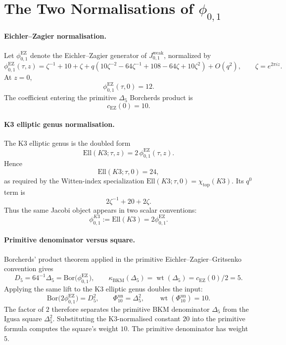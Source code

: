 \providecommand{\Ell}{\mathrm{Ell}}
\providecommand{\EZ}{\mathrm{EZ}}
\providecommand{\Kthree}{K3}
\providecommand{\kBKM}{\kappa_{\mathrm{BKM}}}
\providecommand{\DeltaFive}{\Delta_5}
\providecommand{\PhiTen}{\Phi_{10}^{\mathrm{un}}}

\section*{The Two Normalisations of \(\phi_{0,1}\)}

\paragraph{Eichler--Zagier normalisation.}
Let \(\phi_{0,1}^{\EZ}\) denote the Eichler--Zagier generator of
\(J^{\mathrm{weak}}_{0,1}\), normalized by
\[
  \phi_{0,1}^{\EZ}(\tau,z)
  =
  \zeta^{-1}+10+\zeta
  +
  q(10\zeta^{-2}-64\zeta^{-1}+108-64\zeta+10\zeta^2)
  +O(q^2),
  \qquad
  \zeta=e^{2\pi iz}.
\]
At \(z=0\),
\[
  \phi_{0,1}^{\EZ}(\tau,0)=12.
\]
The coefficient entering the primitive \(\Delta_5\) Borcherds product is
\[
  c_{\EZ}(0)=10.
\]

\paragraph{K3 elliptic genus normalisation.}
The K3 elliptic genus is the doubled form
\[
  \Ell(\Kthree;\tau,z)=2\,\phi_{0,1}^{\EZ}(\tau,z).
\]
Hence
\[
  \Ell(\Kthree;\tau,0)=24,
\]
as required by the Witten-index specialization
\(\Ell(\Kthree;\tau,0)=\chi_{\mathrm{top}}(\Kthree)\). Its \(q^0\) term is
\[
  2\zeta^{-1}+20+2\zeta .
\]
Thus the same Jacobi object appears in two scalar conventions:
\[
  \phi_{0,1}^{K3}:=\Ell(\Kthree)=2\phi_{0,1}^{\EZ}.
\]

\paragraph{Primitive denominator versus square.}
Borcherds' product theorem applied in the primitive
Eichler--Zagier--Gritsenko convention gives
\[
  D_5=64^{-1}\DeltaFive
  =
  \mathrm{Bor}\bigl(\phi_{0,1}^{\EZ}\bigr),
  \qquad
  \kBKM(\DeltaFive)
  =
  \operatorname{wt}(\DeltaFive)
  =
  c_{\EZ}(0)/2
  =
  5 .
\]
Applying the same lift to the K3 elliptic genus doubles the input:
\[
  \mathrm{Bor}\bigl(2\phi_{0,1}^{\EZ}\bigr)=D_5^2,
  \qquad
  \PhiTen=\DeltaFive^2,
  \qquad
  \operatorname{wt}(\PhiTen)=10 .
\]
The factor of \(2\) therefore separates the primitive BKM denominator
\(\Delta_5\) from the Igusa square \(\Delta_5^2\). Substituting the
K3-normalised constant \(20\) into the primitive formula computes
the square's weight \(10\). The primitive denominator has weight \(5\).

